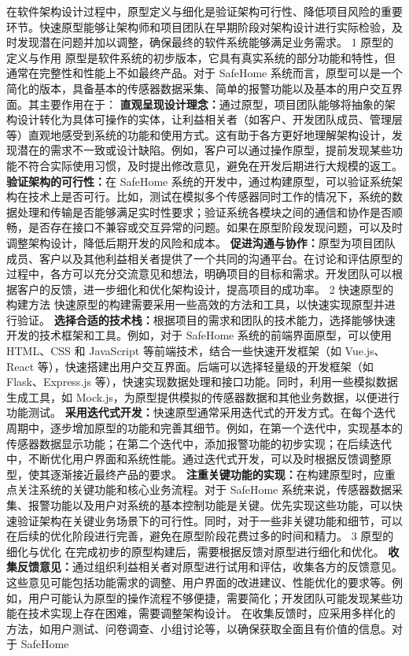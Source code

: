 在软件架构设计过程中，原型定义与细化是验证架构可行性、降低项目风险的重要环节。快速原型能够让架构师和项目团队在早期阶段对架构设计进行实际检验，及时发现潜在问题并加以调整，确保最终的软件系统能够满足业务需求。 1 原型的定义与作用 原型是软件系统的初步版本，它具有真实系统的部分功能和特性，但通常在完整性和性能上不如最终产品。对于 SafeHome 系统而言，原型可以是一个简化的版本，具备基本的传感器数据采集、简单的报警功能以及基本的用户交互界面。其主要作用在于： \textbf{直观呈现设计理念：}通过原型，项目团队能够将抽象的架构设计转化为具体可操作的实体，让利益相关者（如客户、开发团队成员、管理层等）直观地感受到系统的功能和使用方式。这有助于各方更好地理解架构设计，发现潜在的需求不一致或设计缺陷。例如，客户可以通过操作原型，提前发现某些功能不符合实际使用习惯，及时提出修改意见，避免在开发后期进行大规模的返工。 \textbf{验证架构的可行性：}在 SafeHome 系统的开发中，通过构建原型，可以验证系统架构在技术上是否可行。比如，测试在模拟多个传感器同时工作的情况下，系统的数据处理和传输是否能够满足实时性要求；验证系统各模块之间的通信和协作是否顺畅，是否存在接口不兼容或交互异常的问题。如果在原型阶段发现问题，可以及时调整架构设计，降低后期开发的风险和成本。 \textbf{促进沟通与协作：}原型为项目团队成员、客户以及其他利益相关者提供了一个共同的沟通平台。在讨论和评估原型的过程中，各方可以充分交流意见和想法，明确项目的目标和需求。开发团队可以根据客户的反馈，进一步细化和优化架构设计，提高项目的成功率。 2 快速原型的构建方法 快速原型的构建需要采用一些高效的方法和工具，以快速实现原型并进行验证。 \textbf{选择合适的技术栈：}根据项目的需求和团队的技术能力，选择能够快速开发的技术框架和工具。例如，对于 SafeHome 系统的前端界面原型，可以使用 HTML、CSS 和 JavaScript 等前端技术，结合一些快速开发框架（如 Vue.js、React 等），快速搭建出用户交互界面。后端可以选择轻量级的开发框架（如 Flask、Express.js 等），快速实现数据处理和接口功能。同时，利用一些模拟数据生成工具，如 Mock.js，为原型提供模拟的传感器数据和其他业务数据，以便进行功能测试。 \textbf{采用迭代式开发：}快速原型通常采用迭代式的开发方式。在每个迭代周期中，逐步增加原型的功能和完善其细节。例如，在第一个迭代中，实现基本的传感器数据显示功能；在第二个迭代中，添加报警功能的初步实现；在后续迭代中，不断优化用户界面和系统性能。通过迭代式开发，可以及时根据反馈调整原型，使其逐渐接近最终产品的要求。 \textbf{注重关键功能的实现：}在构建原型时，应重点关注系统的关键功能和核心业务流程。对于 SafeHome 系统来说，传感器数据采集、报警功能以及用户对系统的基本控制功能是关键。优先实现这些功能，可以快速验证架构在关键业务场景下的可行性。同时，对于一些非关键功能和细节，可以在后续的优化阶段进行完善，避免在原型阶段花费过多的时间和精力。 3 原型的细化与优化 在完成初步的原型构建后，需要根据反馈对原型进行细化和优化。 \textbf{收集反馈意见：}通过组织利益相关者对原型进行试用和评估，收集各方的反馈意见。这些意见可能包括功能需求的调整、用户界面的改进建议、性能优化的要求等。例如，用户可能认为原型的操作流程不够便捷，需要简化；开发团队可能发现某些功能在技术实现上存在困难，需要调整架构设计。 在收集反馈时，应采用多样化的方法，如用户测试、问卷调查、小组讨论等，以确保获取全面且有价值的信息。对于 SafeHome 